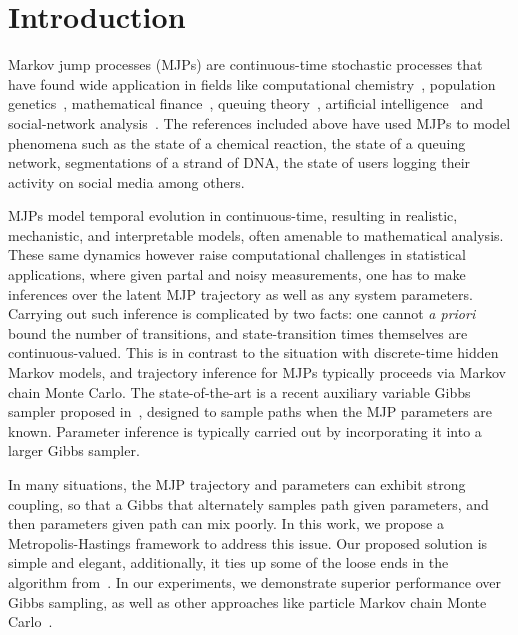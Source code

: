 \section{Introduction}
\label{sec:intro}
Markov jump processes (MJPs) are continuous-time stochastic processes that
have found wide application in fields like computational chemistry~\cite{gillespie97}, 
population genetics~\cite{FearnSher2006}, mathematical finance~\cite{Elliott06}, 
queuing theory~\cite{Breuer2003}, artificial intelligence~\cite{XuShe10} and
social-network analysis~\cite{pan2016markov}. The references included above have
used MJPs to model phenomena such as the state of a chemical reaction, the state 
of a queuing network, segmentations of a strand of DNA, the state of users 
logging their activity on social media among others.

MJPs model temporal evolution in continuous-time, resulting in 
realistic, mechanistic, and interpretable models, often amenable to 
mathematical analysis. These same dynamics however raise computational
challenges in statistical applications, where given partal and noisy 
measurements, one has to make inferences over the latent MJP 
trajectory as well as any system parameters. Carrying out such
inference is complicated by two facts: one cannot {\em a priori} 
bound the number of transitions, and state-transition times themselves
are continuous-valued. This is in contrast to the situation with
discrete-time hidden Markov models, and trajectory inference for 
MJPs typically proceeds via Markov chain Monte Carlo. The 
state-of-the-art is a recent auxiliary variable Gibbs sampler proposed 
in~\cite{RaoTeh13},  designed to sample paths when the MJP parameters
are known. Parameter inference is typically carried out by 
incorporating it into a larger Gibbs sampler. 

In many situations, the MJP trajectory and parameters can exhibit 
strong coupling, so that a Gibbs that alternately samples path given
parameters, and then parameters given path can mix poorly.  
In this work, we propose a Metropolis-Hastings framework to address
this issue. Our proposed solution is simple and elegant, additionally,
it ties up some of the loose ends in the algorithm 
from~\cite{RaoTeh13}.  In our experiments, we demonstrate superior 
performance over Gibbs sampling, as well as other approaches like 
particle Markov chain Monte Carlo~\cite{Andrieu10}.

